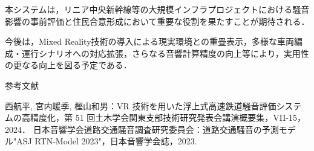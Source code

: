 \documentclass[10pt]{jsarticle}
\begin{document}
本システムは，リニア中央新幹線等の大規模インフラプロジェクトにおける騒音影響の事前評価と住民合意形成において重要な役割を果たすことが期待される．

今後は，Mixed Reality技術の導入による現実環境との重畳表示，多様な車両編成・運行シナリオへの対応拡張，さらなる音響計算精度の向上等により，実用性の更なる向上を図る予定である．

参考文献
\begin{thebibliography}{9}
 西航平, 宮内暖季, 樫山和男：VR 技術を用いた浮上式高速鉄道騒音評価システムの高精度化，第 51 回土木学会関東支部技術研究発表会講演概要集，VII-15， 2024．
 日本音響学会道路交通騒音調査研究委員会：道路交通騒音の予測モデル"ASJ RTN-Model 2023"，日本音響学会誌，2023.
\end{thebibliography}
\end{document}
